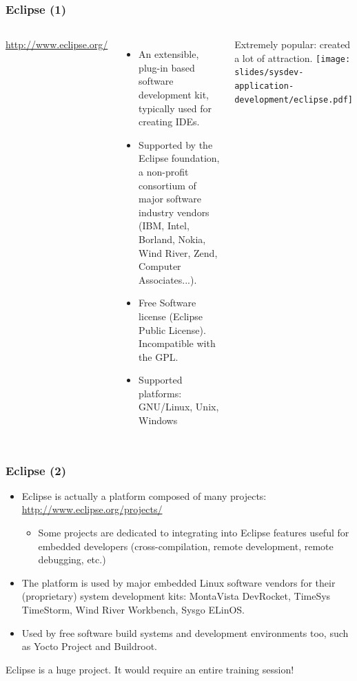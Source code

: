 \begin{frame}
  \frametitle{Eclipse (1)}
  \begin{columns}[T]
    \url{http://www.eclipse.org/}
    \begin{itemize}
    \item An extensible, plug-in based software development kit,
      typically used for creating IDEs.
    \item Supported by the Eclipse foundation, a non-profit consortium
      of major software industry vendors (IBM, Intel, Borland, Nokia,
      Wind River, Zend, Computer Associates...).
    \item Free Software license (Eclipse Public License). Incompatible
      with the GPL.
    \item Supported platforms: GNU/Linux, Unix, Windows
    \end{itemize}
    Extremely popular: created a lot of attraction.
    \texttt{[image: slides/sysdev-application-development/eclipse.pdf]}
  \end{columns}
\end{frame}

\begin{frame}
  \frametitle{Eclipse (2)}
  \begin{itemize}
  \item Eclipse is actually a platform composed of many projects:\\
    \url{http://www.eclipse.org/projects/}
    \begin{itemize}
    \item Some projects are dedicated to integrating into Eclipse
      features useful for embedded developers (cross-compilation,
      remote development, remote debugging, etc.)
    \end{itemize}
  \item The platform is used by major embedded Linux software vendors
    for their (proprietary) system development kits: MontaVista
    DevRocket, TimeSys TimeStorm, Wind River Workbench, Sysgo ELinOS.
  \item Used by free software build systems and development environments
    too, such as Yocto Project and Buildroot.
  \end{itemize}
  Eclipse is a huge project.  It would require an entire training
  session!
\end{frame}

